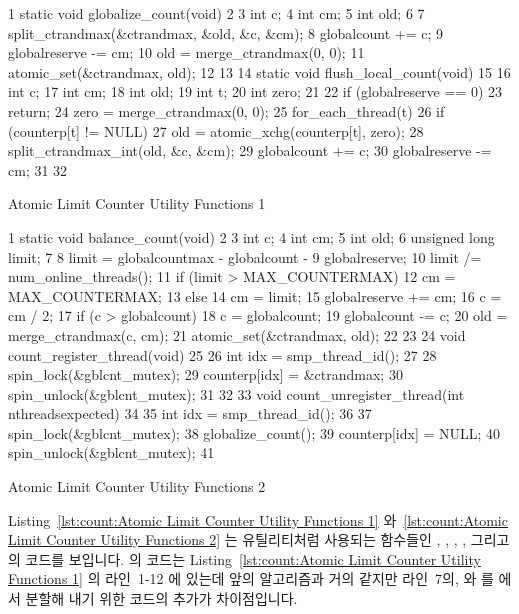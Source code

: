 \begin{listing}[tbp]
{ \scriptsize
\begin{verbbox}
  1 static void globalize_count(void)
  2 {
  3   int c;
  4   int cm;
  5   int old;
  6 
  7   split_ctrandmax(&ctrandmax, &old, &c, &cm);
  8   globalcount += c;
  9   globalreserve -= cm;
 10   old = merge_ctrandmax(0, 0);
 11   atomic_set(&ctrandmax, old);
 12 }
 13 
 14 static void flush_local_count(void)
 15 {
 16   int c;
 17   int cm;
 18   int old;
 19   int t;
 20   int zero;
 21 
 22   if (globalreserve == 0)
 23     return;
 24   zero = merge_ctrandmax(0, 0);
 25   for_each_thread(t)
 26     if (counterp[t] != NULL) {
 27       old = atomic_xchg(counterp[t], zero);
 28       split_ctrandmax_int(old, &c, &cm);
 29       globalcount += c;
 30       globalreserve -= cm;
 31     }
 32 }
\end{verbbox}
}
\centering
\theverbbox
\caption{Atomic Limit Counter Utility Functions 1}
\label{lst:count:Atomic Limit Counter Utility Functions 1}
\end{listing}

\begin{listing}[tb]
{ \scriptsize
\begin{verbbox}
  1 static void balance_count(void)
  2 {
  3   int c;
  4   int cm;
  5   int old;
  6   unsigned long limit;
  7 
  8   limit = globalcountmax - globalcount -
  9           globalreserve;
 10   limit /= num_online_threads();
 11   if (limit > MAX_COUNTERMAX)
 12     cm = MAX_COUNTERMAX;
 13   else
 14     cm = limit;
 15   globalreserve += cm;
 16   c = cm / 2;
 17   if (c > globalcount)
 18     c = globalcount;
 19   globalcount -= c;
 20   old = merge_ctrandmax(c, cm);
 21   atomic_set(&ctrandmax, old);
 22 }
 23 
 24 void count_register_thread(void)
 25 {
 26   int idx = smp_thread_id();
 27 
 28   spin_lock(&gblcnt_mutex);
 29   counterp[idx] = &ctrandmax;
 30   spin_unlock(&gblcnt_mutex);
 31 }
 32 
 33 void count_unregister_thread(int nthreadsexpected)
 34 {
 35   int idx = smp_thread_id();
 36 
 37   spin_lock(&gblcnt_mutex);
 38   globalize_count();
 39   counterp[idx] = NULL;
 40   spin_unlock(&gblcnt_mutex);
 41 }
\end{verbbox}
}
\centering
\theverbbox
\caption{Atomic Limit Counter Utility Functions 2}
\label{lst:count:Atomic Limit Counter Utility Functions 2}
\end{listing}

Listing~\ref{lst:count:Atomic Limit Counter Utility Functions 1}
와~\ref{lst:count:Atomic Limit Counter Utility Functions 2} 는 유틸리티처럼
사용되는 함수들인
,
,
,
, 그리고
 의 코드를 보입니다.
 의 코드는
Listing~\ref{lst:count:Atomic Limit Counter Utility Functions 1} 의 라인~1-12
에 있는데 앞의 알고리즘과 거의 같지만 라인~7의,  와 
를  에서 분할해 내기 위한 코드의 추가가 차이점입니다.
\iffalse

